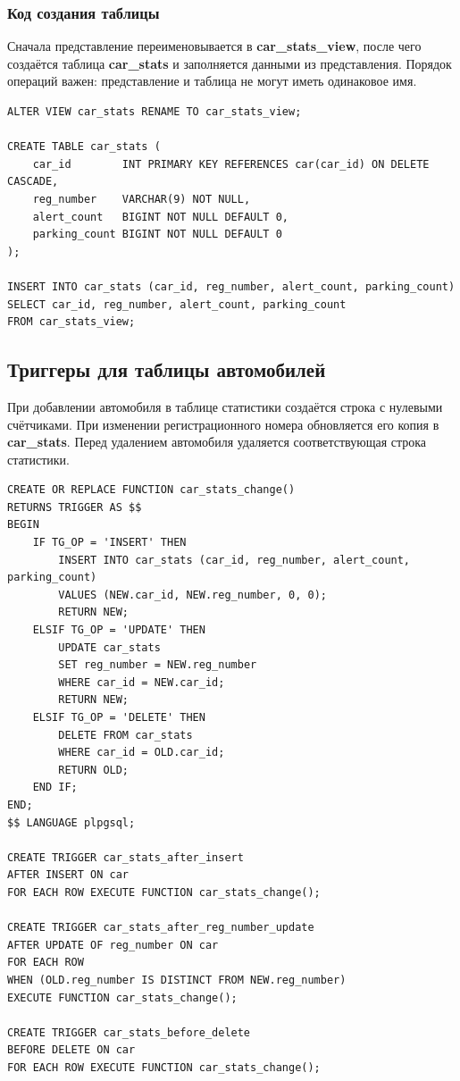\subsubsection*{Код создания таблицы}

Сначала представление переименовывается в \textbf{car\_stats\_view}, после
чего создаётся таблица \textbf{car\_stats} и заполняется данными из
представления. Порядок операций важен: представление и таблица не могут
иметь одинаковое имя.

\begin{lstlisting}[style=sqlstyle, caption={Создание и начальное заполнение таблицы статистики}, label={lst:create-car-stats}]
ALTER VIEW car_stats RENAME TO car_stats_view;

CREATE TABLE car_stats (
    car_id        INT PRIMARY KEY REFERENCES car(car_id) ON DELETE CASCADE,
    reg_number    VARCHAR(9) NOT NULL,
    alert_count   BIGINT NOT NULL DEFAULT 0,
    parking_count BIGINT NOT NULL DEFAULT 0
);

INSERT INTO car_stats (car_id, reg_number, alert_count, parking_count)
SELECT car_id, reg_number, alert_count, parking_count
FROM car_stats_view;
\end{lstlisting}

\subsection{Триггеры для таблицы автомобилей}
При добавлении автомобиля в таблице статистики создаётся строка с нулевыми
счётчиками. При изменении регистрационного номера обновляется его копия в
\textbf{car\_stats}. Перед удалением автомобиля удаляется соответствующая
строка статистики.

\begin{lstlisting}[style=sqlstyle, caption={Функция и триггеры для таблицы \texttt{car}}, label={lst:car-triggers}]
CREATE OR REPLACE FUNCTION car_stats_change()
RETURNS TRIGGER AS $$
BEGIN
    IF TG_OP = 'INSERT' THEN
        INSERT INTO car_stats (car_id, reg_number, alert_count, parking_count)
        VALUES (NEW.car_id, NEW.reg_number, 0, 0);
        RETURN NEW;
    ELSIF TG_OP = 'UPDATE' THEN
        UPDATE car_stats
        SET reg_number = NEW.reg_number
        WHERE car_id = NEW.car_id;
        RETURN NEW;
    ELSIF TG_OP = 'DELETE' THEN
        DELETE FROM car_stats
        WHERE car_id = OLD.car_id;
        RETURN OLD;
    END IF;
END;
$$ LANGUAGE plpgsql;

CREATE TRIGGER car_stats_after_insert
AFTER INSERT ON car
FOR EACH ROW EXECUTE FUNCTION car_stats_change();

CREATE TRIGGER car_stats_after_reg_number_update
AFTER UPDATE OF reg_number ON car
FOR EACH ROW
WHEN (OLD.reg_number IS DISTINCT FROM NEW.reg_number)
EXECUTE FUNCTION car_stats_change();

CREATE TRIGGER car_stats_before_delete
BEFORE DELETE ON car
FOR EACH ROW EXECUTE FUNCTION car_stats_change();
\end{lstlisting}
\newpage

